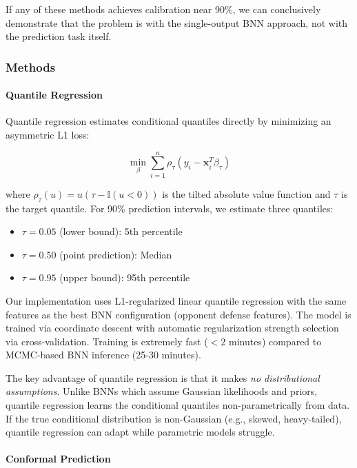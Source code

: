 If any of these methods achieves calibration near 90\%, we can conclusively demonstrate that the problem is with the single-output BNN approach, not with the prediction task itself.

\subsubsection{Methods}

\paragraph{Quantile Regression}

Quantile regression \citep{koenker1978regression} estimates conditional quantiles directly by minimizing an asymmetric L1 loss:

\begin{equation}
    \min_{\beta} \sum_{i=1}^{n} \rho_{\tau}(y_i - \mathbf{x}_i^T \beta_{\tau})
\end{equation}

where $\rho_{\tau}(u) = u(\tau - \mathbb{I}(u < 0))$ is the tilted absolute value function and $\tau$ is the target quantile. For 90\% prediction intervals, we estimate three quantiles:

\begin{itemize}
    \item $\tau = 0.05$ (lower bound): 5th percentile
    \item $\tau = 0.50$ (point prediction): Median
    \item $\tau = 0.95$ (upper bound): 95th percentile
\end{itemize}

Our implementation uses L1-regularized linear quantile regression with the same features as the best BNN configuration (opponent defense features). The model is trained via coordinate descent with automatic regularization strength selection via cross-validation. Training is extremely fast ($<2$ minutes) compared to MCMC-based BNN inference (25-30 minutes).

The key advantage of quantile regression is that it makes \textit{no distributional assumptions}. Unlike BNNs which assume Gaussian likelihoods and priors, quantile regression learns the conditional quantiles non-parametrically from data. If the true conditional distribution is non-Gaussian (e.g., skewed, heavy-tailed), quantile regression can adapt while parametric models struggle.

\paragraph{Conformal Prediction}

